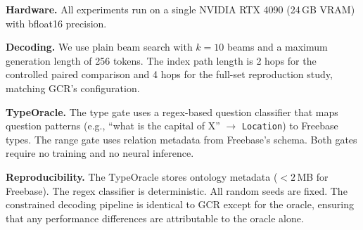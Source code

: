 \textbf{Hardware.} All experiments run on a single NVIDIA RTX 4090 (24\,GB VRAM) with
bfloat16 precision.

\textbf{Decoding.} We use plain beam search with $k=10$ beams and a maximum generation
length of 256 tokens. The index path length is 2 hops for the controlled paired
comparison and 4 hops for the full-set reproduction study, matching GCR's configuration.

\textbf{TypeOracle.} The type gate uses a regex-based question classifier that maps
question patterns (e.g., ``what is the capital of X'' $\rightarrow$ \texttt{Location})
to Freebase types. The range gate uses relation metadata from Freebase's schema. Both
gates require no training and no neural inference.

\textbf{Reproducibility.} The TypeOracle stores ontology metadata ($<2$\,MB for
Freebase). The regex classifier is deterministic. All random seeds are fixed. The
constrained decoding pipeline is identical to GCR except for the oracle, ensuring that
any performance differences are attributable to the oracle alone.